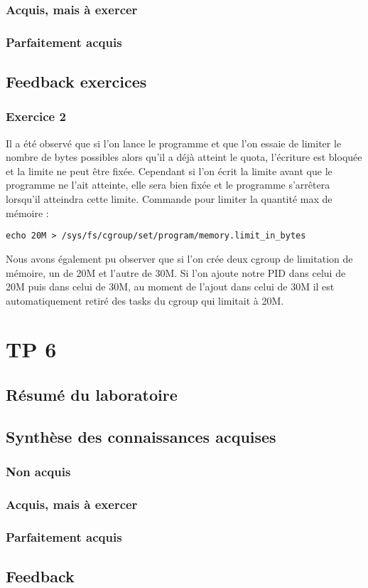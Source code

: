 \documentclass{ReportTemplate}
\begin{document}
\subsection{Acquis, mais à exercer}

\subsection{Parfaitement acquis}

\section{Feedback exercices}
\subsection{Exercice 2}
Il a été observé que si l'on lance le programme et que l'on essaie de limiter le
nombre de bytes possibles alors qu'il a déjà atteint le quota, l'écriture est
bloquée et la limite ne peut être fixée. Cependant si l'on écrit la limite avant
que le programme ne l'ait atteinte, elle sera bien fixée et le programme
s'arrêtera lorsqu'il atteindra cette limite.\newline
Commande pour limiter la quantité max de mémoire :
\begin{verbatim}
echo 20M > /sys/fs/cgroup/set/program/memory.limit_in_bytes
\end{verbatim}

Nous avons également pu observer que si l'on crée deux cgroup de limitation de
mémoire, un de 20M et l'autre de 30M. Si l'on ajoute notre PID dans celui de 20M
puis dans celui de 30M, au moment de l'ajout dans celui de 30M il est
automatiquement retiré des tasks du cgroup qui limitait à 20M.

\chapter{TP 6}
\section{Résumé du laboratoire}

\section{Synthèse des connaissances acquises}
\subsection{Non acquis}

\subsection{Acquis, mais à exercer}

\subsection{Parfaitement acquis}

\section{Feedback}
\end{document}
